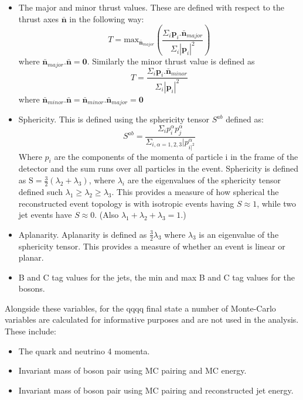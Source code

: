 \begin{itemize}
\begin{equation}
\end{equation}
\item The major and minor thrust values. These are defined with respect to the thrust axes $\bar{\textbf{n}}$ in the following way:
\begin{equation}
T = \text{max}_{\bar{\textbf{n}}_{major}} (\frac{\Sigma_{i} \textbf{p}_{i}.\bar{\textbf{n}}_{major}}{\Sigma_{i} |\textbf{p}_{i}|^{2}})
\end{equation}
where $\bar{\textbf{n}}_{major}.\bar{\textbf{n}} = \textbf{0}$. Similarly the minor thrust value is defined as 
\begin{equation}
T = \frac{\Sigma_{i} \textbf{p}_{i}.\bar{\textbf{n}}_{minor}}{\Sigma_{i} |\textbf{p}_{i}|^{2}}
\end{equation}
where $\bar{\textbf{n}}_{minor}.\bar{\textbf{n}} = \bar{\textbf{n}}_{minor}.\bar{\textbf{n}}_{major} =\textbf{0}$
\item Sphericity. This is defined using the sphericity tensor $S^{ab}$ defined as:
\begin{equation}
S^{ab} = \frac{\Sigma_{i}p^{\alpha}_{i}p^{\alpha}_{j}}{\Sigma_{i,\alpha=1,2,3}|p^{\alpha}_{i|^{2}}}
\end{equation}
Where $p_{i}$ are the components of the momenta of particle i in the frame of the detector and the sum runs over all particles in the event. Sphericity is defined as $\text{S} = \frac{3}{2}(\lambda_{2} + \lambda_{3})$, where $\lambda_{i}$ are the eigenvalues of the sphericity tensor defined such $\lambda_{1} \geq \lambda_{2} \geq \lambda_{3}$.  This provides a measure of how spherical the reconstructed event topology is with isotropic events having $S \approx 1$, while two jet events have $S \approx 0$.  (Also $\lambda_{1} + \lambda_{2} + \lambda_{3} = 1$.)
\item Aplanarity. Aplanarity is defined as $\frac{3}{2} \lambda_{3}$ where $\lambda_{3}$ is an eigenvalue of the sphericity tensor.  This provides a measure of whether an event is linear or planar.
\item B and C tag values for the jets, the min and max B and C tag values for the bosons.
\end{itemize}

Alongside these variables, for the \nu{\nu}qqqq final state a number of Monte-Carlo variables are calculated for informative purposes and are not used in the analysis. These include:
\begin{itemize}
\item The quark and neutrino 4 momenta.
\item Invariant mass of boson pair using MC pairing and MC energy.
\item Invariant mass of boson pair using MC pairing and reconstructed jet energy.
\end{itemize}

